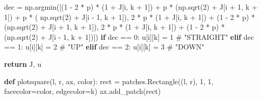 \documentclass[
]{article}
\newenvironment{Shaded}{\begin{snugshade}}{\end{snugshade}}
\newcommand{\CommentTok}[1]{\textcolor[rgb]{0.37,0.37,0.37}{#1}}
\newcommand{\ControlFlowTok}[1]{\textcolor[rgb]{0.00,0.23,0.31}{\textbf{#1}}}
\newcommand{\DecValTok}[1]{\textcolor[rgb]{0.68,0.00,0.00}{#1}}
\newcommand{\KeywordTok}[1]{\textcolor[rgb]{0.00,0.23,0.31}{\textbf{#1}}}
\newcommand{\NormalTok}[1]{\textcolor[rgb]{0.00,0.23,0.31}{#1}}
\newcommand{\OperatorTok}[1]{\textcolor[rgb]{0.37,0.37,0.37}{#1}}
\newcommand{\StringTok}[1]{\textcolor[rgb]{0.13,0.47,0.30}{#1}}
\begin{document}
\begin{Shaded}
\begin{Highlighting}[]
\NormalTok{                dec }\OperatorTok{=}\NormalTok{ np.argmin([(}\DecValTok{1} \OperatorTok{{-}} \DecValTok{2} \OperatorTok{*}\NormalTok{ p) }\OperatorTok{*}\NormalTok{ (}\DecValTok{1} \OperatorTok{+}\NormalTok{ J[i, k }\OperatorTok{+} \DecValTok{1}\NormalTok{]) }\OperatorTok{+}\NormalTok{ p }\OperatorTok{*}\NormalTok{ (np.sqrt(}\DecValTok{2}\NormalTok{) }\OperatorTok{+}\NormalTok{ J[i }\OperatorTok{+} \DecValTok{1}\NormalTok{, k }\OperatorTok{+} \DecValTok{1}\NormalTok{]) }\OperatorTok{+}\NormalTok{ p }\OperatorTok{*}\NormalTok{ (}
\NormalTok{                        np.sqrt(}\DecValTok{2}\NormalTok{) }\OperatorTok{+}\NormalTok{ J[i }\OperatorTok{{-}} \DecValTok{1}\NormalTok{, k }\OperatorTok{+} \DecValTok{1}\NormalTok{]),}
                                 \DecValTok{2} \OperatorTok{*}\NormalTok{ p }\OperatorTok{*}\NormalTok{ (}\DecValTok{1} \OperatorTok{+}\NormalTok{ J[i, k }\OperatorTok{+} \DecValTok{1}\NormalTok{]) }\OperatorTok{+}\NormalTok{ (}\DecValTok{1} \OperatorTok{{-}} \DecValTok{2} \OperatorTok{*}\NormalTok{ p) }\OperatorTok{*}\NormalTok{ (np.sqrt(}\DecValTok{2}\NormalTok{) }\OperatorTok{+}\NormalTok{ J[i }\OperatorTok{+} \DecValTok{1}\NormalTok{, k }\OperatorTok{+} \DecValTok{1}\NormalTok{]),}
                                 \DecValTok{2} \OperatorTok{*}\NormalTok{ p }\OperatorTok{*}\NormalTok{ (}\DecValTok{1} \OperatorTok{+}\NormalTok{ J[i, k }\OperatorTok{+} \DecValTok{1}\NormalTok{]) }\OperatorTok{+}\NormalTok{ (}\DecValTok{1} \OperatorTok{{-}} \DecValTok{2} \OperatorTok{*}\NormalTok{ p) }\OperatorTok{*}\NormalTok{ (np.sqrt(}\DecValTok{2}\NormalTok{) }\OperatorTok{+}\NormalTok{ J[i }\OperatorTok{{-}} \DecValTok{1}\NormalTok{, k }\OperatorTok{+} \DecValTok{1}\NormalTok{])])}
                \ControlFlowTok{if}\NormalTok{ dec }\OperatorTok{==} \DecValTok{0}\NormalTok{:}
\NormalTok{                    u[i][k] }\OperatorTok{=} \DecValTok{1}  \CommentTok{\# "STRAIGHT"}
                \ControlFlowTok{elif}\NormalTok{ dec }\OperatorTok{==} \DecValTok{1}\NormalTok{:}
\NormalTok{                    u[i][k] }\OperatorTok{=} \DecValTok{2}  \CommentTok{\# "UP"}
                \ControlFlowTok{elif}\NormalTok{ dec }\OperatorTok{==} \DecValTok{2}\NormalTok{:}
\NormalTok{                    u[i][k] }\OperatorTok{=} \DecValTok{3}  \CommentTok{\# "DOWN"}

    \ControlFlowTok{return}\NormalTok{ J, u}
\end{Highlighting}
\end{Shaded}

\begin{Shaded}
\begin{Highlighting}[]
\KeywordTok{def}\NormalTok{ plotsquare(l, r, ax, color):}
\NormalTok{    rect }\OperatorTok{=}\NormalTok{ patches.Rectangle((l, r), }\DecValTok{1}\NormalTok{, }\DecValTok{1}\NormalTok{, facecolor}\OperatorTok{=}\NormalTok{color, edgecolor}\OperatorTok{=}\StringTok{\textquotesingle{}k\textquotesingle{}}\NormalTok{)}
\NormalTok{    ax.add\_patch(rect)}
\end{Highlighting}
\end{Shaded}
\end{document}
